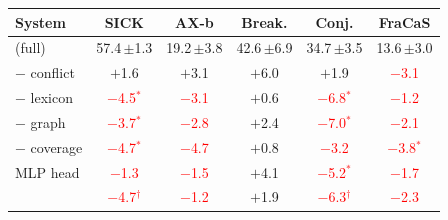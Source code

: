 \begin{tabular*}{\textwidth}{@{\extracolsep{\fill}}lccccc@{}}
\toprule
System & SICK & AX-b & Break. & Conj. & FraCaS \\
\midrule
\model{} (full) & 57.4\,{\tiny$\pm$1.3} & 19.2\,{\tiny$\pm$3.8} & 42.6\,{\tiny$\pm$6.9} & 34.7\,{\tiny$\pm$3.5} & 13.6\,{\tiny$\pm$3.0} \\
$-$ conflict & $+$1.6 & $+$3.1 & $+$6.0 & $+$1.9 & \textcolor{red}{$-$3.1} \\
$-$ lexicon & \textcolor{red}{$-$4.5$^{*}$} & \textcolor{red}{$-$3.1} & $+$0.6 & \textcolor{red}{$-$6.8$^{*}$} & \textcolor{red}{$-$1.2} \\
$-$ graph & \textcolor{red}{$-$3.7$^{*}$} & \textcolor{red}{$-$2.8} & $+$2.4 & \textcolor{red}{$-$7.0$^{*}$} & \textcolor{red}{$-$2.1} \\
$-$ coverage & \textcolor{red}{$-$4.7$^{*}$} & \textcolor{red}{$-$4.7} & $+$0.8 & \textcolor{red}{$-$3.2} & \textcolor{red}{$-$3.8$^{*}$} \\
MLP head & \textcolor{red}{$-$1.3} & \textcolor{red}{$-$1.5} & $+$4.1 & \textcolor{red}{$-$5.2$^{*}$} & \textcolor{red}{$-$1.7} \\
\midrule
\cls{} & \textcolor{red}{$-$4.7$^{\dagger}$} & \textcolor{red}{$-$1.2} & $+$1.9 & \textcolor{red}{$-$6.3$^{\dagger}$} & \textcolor{red}{$-$2.3} \\
\bottomrule
\end{tabular*}
